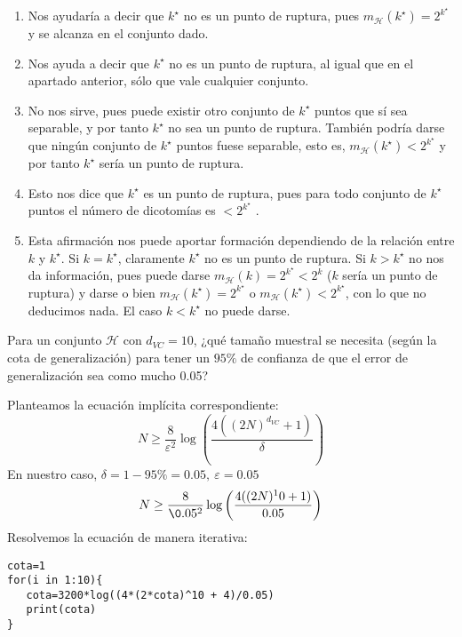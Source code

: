 \documentclass[11pt,leqno]{article}
\theoremstyle{definition}
\begin{document}
\begin{solucion} \textbf{ }
\begin{enumerate}[a]
\item  Nos ayudaría a decir que $k^\star$ no es un punto de ruptura, pues $m_\mathcal{H}(k^\star)= 2^{k^\star}$ y se alcanza en el conjunto dado.
\item  Nos ayuda a decir que $k^\star$ no es un punto de ruptura, al igual que en el apartado anterior, sólo que vale cualquier conjunto.
\item  No nos sirve, pues puede existir otro conjunto de $k^\star$ puntos que sí sea separable, y por tanto $k^\star$ no sea un punto de ruptura. También podría darse que ningún conjunto de $k^\star$ puntos fuese separable, esto es, $m_\mathcal{H}(k^\star) < 2^{k^\star}$ y por tanto $k^\star$ sería un punto de ruptura.
\item  Esto nos dice que $k^\star$ es un punto de ruptura, pues para todo conjunto de $k^\star$ puntos el número de dicotomías es $< 2^{k^\star}$ .
\item  Esta afirmación nos puede aportar formación dependiendo de la relación entre $k$ y $k^\star$. Si $k = k^\star$, claramente $k^\star$ no es un punto de ruptura. Si $k > k^\star$ no nos da información, pues puede darse $m_{\mathcal{H}}(k)= 2^{k^\star}<2^k$ ($k$ sería un punto de ruptura) y darse o bien $m_{\mathcal{H}}(k^\star) = 2^{k^\star}$ o $m_{\mathcal{H}}(k^\star) < 2^{k^\star}$, con lo que no deducimos nada. El caso $k < k^\star$ no puede darse.
\end{enumerate}
\end{solucion}

\begin{cuestion}
Para un conjunto $\mathcal{H}$ con $d_{VC} = 10$, ¿qué tamaño muestral se necesita (según la cota de generalización) para tener un $95\%$ de confianza de que el error de generalización sea como mucho 0.05?
\end{cuestion}

Planteamos la ecuación implícita correspondiente:
	\[ N \geq \frac{8}{\varepsilon^2} \log\left( \frac{4((2N)^{d_{VC}}+1)}{\delta}\right) \]
En nuestro caso, $\delta = 1-95\%= 0.05,\ \varepsilon=0.05$
	\[ N \geq \frac{8}{\0.05^2} \log\left( \frac{4((2N)^10+1)}{0.05}\right) \]
Resolvemos la ecuación de manera iterativa:

\begin{lstlisting}[R]
cota=1
for(i in 1:10){
   cota=3200*log((4*(2*cota)^10 + 4)/0.05)
   print(cota)
}
\end{lstlisting}
\end{document}
